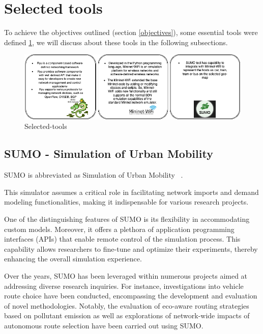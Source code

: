 \documentclass[
  oneside,
  11pt, a4paper,
  footinclude=true,
  headinclude=true,
  cleardoublepage=empty
]{scrbook}
\begin{document}
\section{Selected tools}
\label{tools}

To achieve the objectives outlined (section \ref{objectives}), some essential tools were defined \ref{selected-tools}, we will discuss about these tools in the following subsections.

\begin{figure}[H]
\begin{center}
  \includegraphics[width=1\textwidth]{img/selected tools.png}
\end{center}
  \caption{Selected-tools}\par
  \centering  
\label{selected-tools}
\end{figure}

\subsection{SUMO - Simulation of Urban Mobility}
\label{SUMO}

SUMO is abbreviated as Simulation of Urban Mobility ~\cite{dlr127994}. 

This simulator assumes a critical role in facilitating network imports and demand modeling functionalities, making it indispensable for various research projects.

One of the distinguishing features of SUMO is its flexibility in accommodating custom models. Moreover, it offers a plethora of application programming interfaces (APIs) that enable remote control of the simulation process. This capability allows researchers to fine-tune and optimize their experiments, thereby enhancing the overall simulation experience.

Over the years, SUMO has been leveraged within numerous projects aimed at addressing diverse research inquiries. For instance, investigations into vehicle route choice have been conducted, encompassing the development and evaluation of novel methodologies. Notably, the evaluation of eco-aware routing strategies based on pollutant emission as well as explorations of network-wide impacts of autonomous route selection have been carried out using SUMO.
\end{document}
